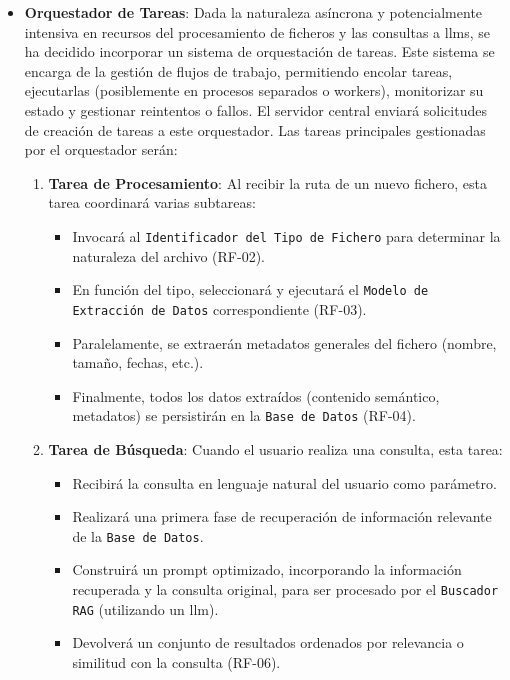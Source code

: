 \begin{itemize}
    \item \textbf{Orquestador de Tareas}:
    Dada la naturaleza asíncrona y potencialmente intensiva en recursos del procesamiento de ficheros y las consultas a \glspl{llm}, se ha decidido incorporar un sistema de orquestación de tareas. Este sistema se encarga de la gestión de flujos de trabajo, permitiendo encolar tareas, ejecutarlas (posiblemente en procesos separados o workers), monitorizar su estado y gestionar reintentos o fallos. El servidor central enviará solicitudes de creación de tareas a este orquestador. Las tareas principales gestionadas por el orquestador serán:
    \begin{enumerate}
        \item \textbf{Tarea de Procesamiento}:
            Al recibir la ruta de un nuevo fichero, esta tarea coordinará varias subtareas:
            \begin{itemize}
                \item Invocará al \texttt{Identificador del Tipo de Fichero} para determinar la naturaleza del archivo (RF-02).
                \item En función del tipo, seleccionará y ejecutará el \texttt{Modelo de Extracción de Datos} correspondiente (RF-03).
                \item Paralelamente, se extraerán metadatos generales del fichero (nombre, tamaño, fechas, etc.).
                \item Finalmente, todos los datos extraídos (contenido semántico, metadatos) se persistirán en la \texttt{Base de Datos} (RF-04).
            \end{itemize}
        \item \textbf{Tarea de Búsqueda}:
            Cuando el usuario realiza una consulta, esta tarea:
            \begin{itemize}
                \item Recibirá la consulta en lenguaje natural del usuario como parámetro.
                \item Realizará una primera fase de recuperación de información relevante de la \texttt{Base de Datos}.
                \item Construirá un prompt optimizado, incorporando la información recuperada y la consulta original, para ser procesado por el \texttt{Buscador RAG} (utilizando un \gls{llm}).
                \item Devolverá un conjunto de resultados ordenados por relevancia o similitud con la consulta (RF-06).
            \end{itemize}
    \end{enumerate}


\end{itemize}
